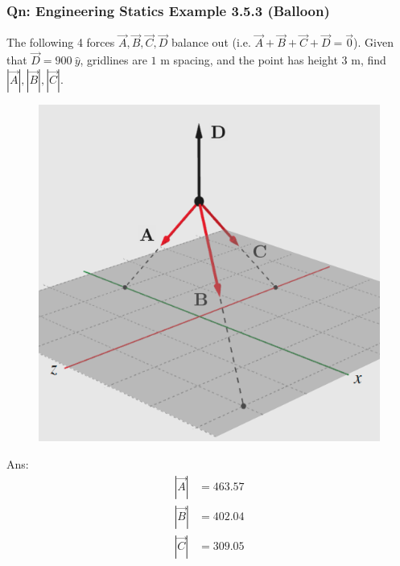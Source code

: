 \documentclass{article}
\begin{document}
\subsubsection{Qn: Engineering Statics Example 3.5.3 (Balloon)}
The following 4 forces $\vec A, \vec B, \vec C, \vec D$ balance out (i.e. $\vec{A} + \vec{B} + \vec{C} + \vec{D} = \vec{0}$). Given that $\vec D = 900\ \hat{y}$, gridlines are $1 \text{ m}$ spacing, and the point has height $3\text{ m}$, find $|\vec A|, |\vec B|, |\vec C|$. \\
{
\begin{figure} 
\includegraphics[width=\linewidth]{images/staticsballoon.png}
\label{fig:staticsballoon}
\end{figure}
Ans: 
\begin{align*}
    |\vec{A}| &= 463.57 \\ 
    |\vec{B}| &= 402.04 \\ 
    |\vec{C}| &= 309.05 
\end{align*}
\\[400pt]
}
\end{document}
